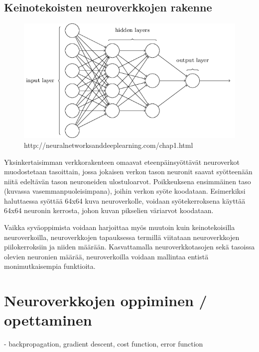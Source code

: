 \documentclass[11pt]{article}
\theoremstyle{plain}
\theoremstyle{definition}
\begin{document}


  \subsection{Keinotekoisten neuroverkkojen rakenne}

  \begin{figure}[h]
  \label{pic:neuralnet}
  \centering
  \includegraphics[scale=0.5]{basic-neuralnet}
  \caption{http://neuralnetworksanddeeplearning.com/chap1.html}
  \end{figure}

  Yksinkertaisimman verkkorakenteen omaavat eteenpäinsyöttävät neuroverkot muodostetaan tasoittain, jossa jokaisen verkon tason neuronit saavat syötteenään niitä edeltävän tason neuroneiden ulostuloarvot. Poikkeuksena ensimmäinen taso (kuvassa vasemmanpuoleisimpana), joihin verkon syöte koodataan. Esimerkiksi haluttaessa syöttää 64x64 kuva neuroverkolle, voidaan syötekerroksena käyttää 64x64 neuronin kerrosta, johon kuvan pikselien väriarvot koodataan.

  Vaikka syväoppimista voidaan harjoittaa myös muutoin kuin keinotekoisilla neuroverkoilla, neuroverkkojen tapauksessa termillä viitataan neuroverkkojen piilokerroksiin ja niiden määrään. Kasvattamalla neuroverkkotasojen sekä tasoissa olevien neuronien määrää, neuroverkoilla voidaan mallintaa entistä monimutkaisempia funktioita.

  \section{Neuroverkkojen oppiminen / opettaminen}
  - backpropagation, gradient descent, cost function, error function
\end{document}
